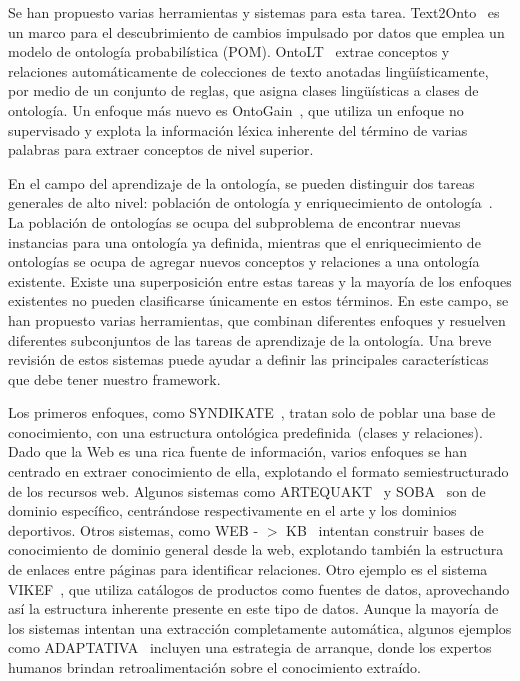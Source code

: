 Se han propuesto varias herramientas y sistemas para esta tarea. Text2Onto~\cite{cimiano2005text2onto} es un marco para el descubrimiento de cambios impulsado por datos que emplea un modelo de ontología probabilística (POM).
OntoLT~\cite{buitelaar2004ontolt} extrae conceptos y relaciones automáticamente de colecciones de texto anotadas lingüísticamente, por medio de un conjunto de reglas, que asigna clases lingüísticas a clases de ontología.
Un enfoque más nuevo es OntoGain~\cite{drymonas2010unsupervised}, que utiliza un enfoque no supervisado y explota la información léxica inherente del término de varias palabras para extraer conceptos de nivel superior.

En el campo del aprendizaje de la ontología, se pueden distinguir dos tareas generales de alto nivel: población de ontología y enriquecimiento de ontología~\cite{petasis2011ontology}. La población de ontologías se ocupa del subproblema de encontrar nuevas instancias para una ontología ya definida, mientras que el enriquecimiento de ontologías se ocupa de agregar nuevos conceptos y relaciones a una ontología existente. Existe una superposición entre estas tareas y la mayoría de los enfoques existentes no pueden clasificarse únicamente en estos términos. En este campo, se han propuesto varias herramientas, que combinan diferentes enfoques y resuelven diferentes subconjuntos de las tareas de aprendizaje de la ontología. Una breve revisión de estos sistemas puede ayudar a definir las principales características que debe tener nuestro framework.

Los primeros enfoques, como SYNDIKATE~\cite{syndikate}, tratan solo de poblar una base de conocimiento, con una estructura ontológica predefinida~(clases y relaciones). Dado que la Web es una rica fuente de información, varios enfoques se han centrado en extraer conocimiento de ella, explotando el formato semiestructurado de los recursos web. Algunos sistemas como ARTEQUAKT~\cite{artequakt} y SOBA~\cite{soba} son de dominio específico, centrándose respectivamente en el arte y los dominios deportivos. Otros sistemas, como WEB - $> $ KB~\cite{webkb} intentan construir bases de conocimiento de dominio general desde la web, explotando también la estructura de enlaces entre páginas para identificar relaciones. Otro ejemplo es el sistema VIKEF~\cite{vikef}, que utiliza catálogos de productos como fuentes de datos, aprovechando así la estructura inherente presente en este tipo de datos. Aunque la mayoría de los sistemas intentan una extracción completamente automática, algunos ejemplos como ADAPTATIVA~\cite{adaptativa} incluyen una estrategia de arranque, donde los expertos humanos brindan retroalimentación sobre el conocimiento extraído.

